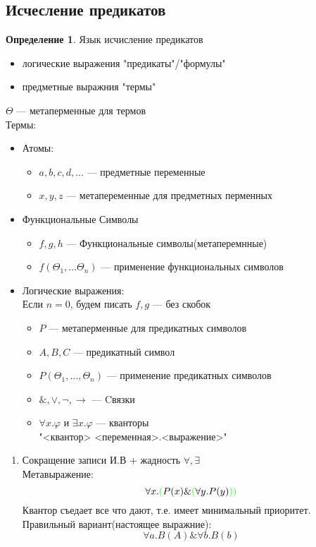 \documentclass[oneside]{book}
\theoremstyle{plain}
\theoremstyle{remark}
\theoremstyle{definition}
\newtheorem*{definition}{Определение}
\begin{document}
\subsection{Исчесление предикатов}
\label{sec:org5e338b6}
\begin{definition}
Язык исчисление предикатов
\begin{itemize}
\item логические выражения "предикаты"/"формулы"
\item предметные выражния "термы"
\end{itemize}
\(\Theta\) --- метаперменные для термов \\
Термы:
\begin{itemize}
\item Атомы:
\begin{itemize}
\item \(a, b, c, d, \dots\) --- предметные переменные
\item \(x, y, z\) --- метапеременные для предметных перменных
\end{itemize}
\item Функциональные Символы
\begin{itemize}
\item \(f, g, h\) --- Функциональные символы(метаперемнные)
\item \(f(\Theta_1, \dots \Theta_n)\) --- применение функциональных символов
\end{itemize}
\item Логические выражения: \\
\color{gray}Если \(n = 0\), будем писать \(f, g\) --- без скобок\color{black}
\begin{itemize}
\item \(P\) --- метаперменные для предикатных символов
\item \(A, B, C\) --- предикатный символ
\item \(P(\Theta_1, \dots, \Theta_n)\) --- применение предикатных символов
\item \(\&, \vee, \neg, \to\) --- Cвязки
\item \(\forall x.\varphi\) и \(\exists x.\varphi\) --- кванторы \\
\color{gray}"<квантор> <переменная>.<выражение>"\color{black} \\
\end{itemize}
\end{itemize}
\end{definition}
\begin{enumerate}
\item Сокращение записи
\label{sec:org9d9d8e6}
И.В + жадность \(\forall, \exists\) \\
Метавыражение:
\[ \forall x. \color{green}(\color{black}P(x) \& \color{green}(\color{black}\forall y. P(y) \color{green}))\color{black} \]
Квантор съедает все что дают, т.е. имеет минимальный приоритет. \\
Правильный вариант(настоящее выражние):
\[ \forall a. B(A) \& \forall b. B(b) \]
\end{enumerate}
\end{document}
